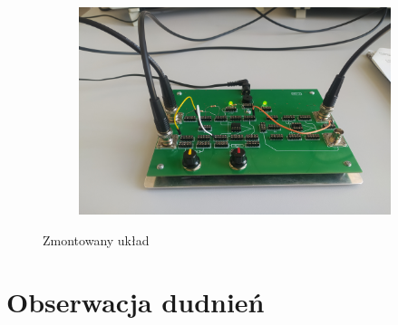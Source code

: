 \begin{itemize}
\begin{figure}[H]
\begin{subfigure}[h]{0.4\textwidth}
            \includegraphics[width=\textwidth]{img/phone/1651502036824_scaled.png}
        \end{subfigure}
        \caption{Zmontowany układ}
        \label{sumator:zmontowany_uklad}
    \end{figure}
\end{itemize}

\section{Obserwacja dudnień}

